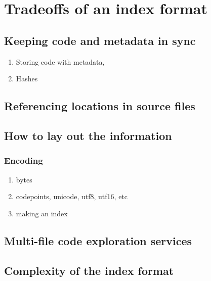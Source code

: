 
\chapter{Tradeoffs of an index format}\label{chap:tradeoffs-of-an-index-format}



\section{Keeping code and metadata in sync}
\begin{enumerate}
    \item Storing code with metadata,
    \item Hashes
\end{enumerate}

\section{Referencing locations in source files}

\section{How to lay out the information}

\subsection{Encoding}
\begin{enumerate}
    \item bytes
    \item codepoints, unicode, utf8, utf16, etc
    \item making an index
\end{enumerate}

\section{Multi-file code exploration services}

\section{Complexity of the index format}
